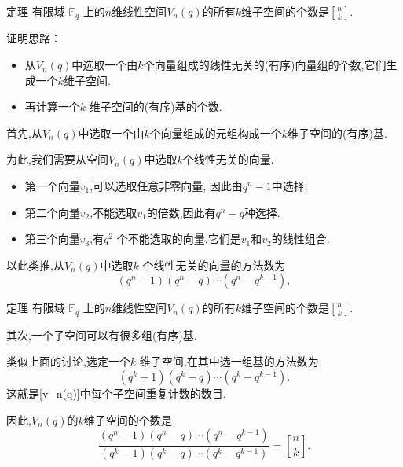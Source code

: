\documentclass[punct]{ctexbeamer}
\def\pf{\noindent {\bf 证明\ }}
\begin{document}
\begin{frame}
\begin{block}{定理}
    有限域 $\mathbb{F}_q$ 上的$n$维线性空间$V_n(q)$的所有$k$维子空间的个数是${n\brack k}$.
\end{block}
证明思路：
\begin{itemize}
    \item 从$V_n(q)$中选取一个由$k$个向量组成的线性无关的(有序)向量组的个数,它们生成一个$k$维子空间.
    \item 再计算一个$k$ 维子空间的(有序)基的个数.
\end{itemize}


\pf
首先,从$V_n(q)$中选取一个由$k$个向量组成的元组构成一个$k$维子空间的(有序)基.

为此,我们需要从空间$V_n(q)$中选取$k$个线性无关的向量.
\begin{itemize}
    \item 第一个向量$v_1$,可以选取任意非零向量,
    因此由$q^n-1$中选择.

    \item 第二个向量$v_2$,不能选取$v_1$的倍数,因此有$q^n-q$种选择.

    \item 第三个向量$v_3$,有$q^2$ 个不能选取的向量,它们是$v_1$和$v_2$的线性组合.
\end{itemize}



以此类推,从$V_n(q)$中选取$k$ 个线性无关的向量的方法数为
\begin{equation}\label{v_n(q)}
    (q^n-1)(q^n-q)\cdots(q^n-q^{k-1}),
\end{equation}
\end{frame}


\begin{frame}
\begin{block}{定理}
有限域 $\mathbb{F}_q$ 上的$n$维线性空间$V_n(q)$的所有$k$维子空间的个数是${n\brack k}$.
\end{block}


\indent 其次,一个子空间可以有很多组(有序)基.


类似上面的讨论,选定一个$k$ 维子空间,在其中选一组基的方法数为
		$$(q^k-1)(q^k-q)\cdots(q^k-q^{k-1}).$$
		这就是\eqref{v_n(q)}中每个子空间重复计数的数目.


        因此,$V_n(q)$的$k$维子空间的个数是
		$$\frac{(q^n-1)(q^n-q)\cdots(q^n-q^{k-1})}{(q^k-1)(q^k-q)\cdots(q^k-q^{k-1})}={n\brack k}.$$


\end{frame}
\end{document}

